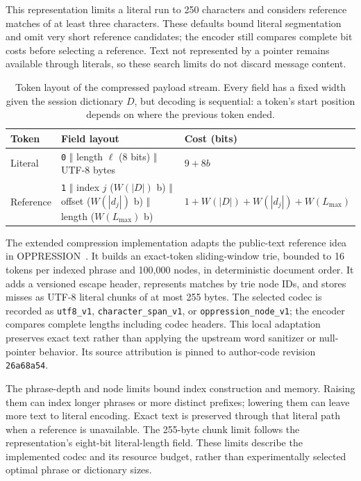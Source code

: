 This representation limits a literal run to 250 characters and considers reference matches of at least three characters. These defaults bound literal segmentation and omit very short reference candidates; the encoder still compares complete bit costs before selecting a reference. Text not represented by a pointer remains available through literals, so these search limits do not discard message content.

\begin{table}[H]
\centering
\caption{Token layout of the compressed payload stream. Every field has a fixed width given the session dictionary $D$, but decoding is sequential: a token's start position depends on where the previous token ended.}
\label{tab:token-layout}
\small
\begin{tabularx}{\columnwidth}{|l|X|l|}
\hline
Token & Field layout & Cost (bits) \\
\hline
Literal & \texttt{0} $\Vert$ length $\ell$ (8 bits) $\Vert$ UTF-8 bytes & $9+8b$ \\
\hline
Reference & \texttt{1} $\Vert$ index $j$ ($W(|D|)$ b) $\Vert$ offset ($W(|d_j|)$ b) $\Vert$ length ($W(L_{\max})$ b) & $1+W(|D|)+W(|d_j|)+W(L_{\max})$ \\
\hline
\end{tabularx}
\end{table}

The extended compression implementation adapts the public-text reference idea in OPPRESSION~\cite{zillien2024oppression}. It builds an exact-token sliding-window trie, bounded to 16 tokens per indexed phrase and 100,000 nodes, in deterministic document order. It adds a versioned escape header, represents matches by trie node IDs, and stores misses as UTF-8 literal chunks of at most 255 bytes. The selected codec is recorded as \texttt{utf8\_v1}, \texttt{character\_span\_v1}, or \texttt{oppression\_node\_v1}; the encoder compares complete lengths including codec headers. This local adaptation preserves exact text rather than applying the upstream word sanitizer or null-pointer behavior. Its source attribution is pinned to author-code revision \texttt{26a68a54}.

The phrase-depth and node limits bound index construction and memory. Raising them can index longer phrases or more distinct prefixes; lowering them can leave more text to literal encoding. Exact text is preserved through that literal path when a reference is unavailable. The 255-byte chunk limit follows the representation's eight-bit literal-length field. These limits describe the implemented codec and its resource budget, rather than experimentally selected optimal phrase or dictionary sizes.

